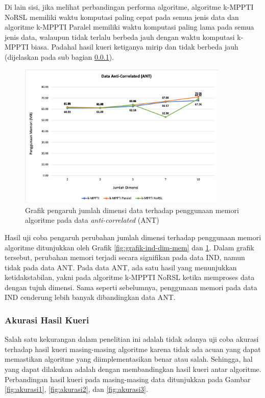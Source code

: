 Di lain sisi, jika melihat perbandingan performa algoritme, algoritme k-MPPTI NoRSL memiliki waktu komputasi paling cepat pada semua jenis data dan algoritme k-MPPTI Paralel memiliki waktu komputasi paling lama pada semua jenis data, walaupun tidak terlalu berbeda jauh dengan waktu komputasi k-MPPTI biasa. Padahal hasil kueri ketiganya mirip dan tidak berbeda jauh (dijelaskan pada sub bagian \ref{hasil-kueri}).

\begin{figure}[H]
	\centering
	\includegraphics[width=10cm]{assets/img/bab5/grafik-ant-dim-mem.png}
	\caption{Grafik pengaruh jumlah dimensi data terhadap penggunaan memori algoritme pada data \textit{anti-correlated} (ANT)}
	\label{fig:grafik-ant-dim-mem}
\end{figure}

Hasil uji coba pengaruh perubahan jumlah dimensi terhadap penggunaan memori algoritme ditunjukkan oleh Grafik \ref{fig:grafik-ind-dim-mem} dan \ref{fig:grafik-ant-dim-mem}. Dalam grafik tersebut, perubahan memori terjadi secara signifikan pada data IND, namun tidak pada data ANT. Pada data ANT, ada satu hasil yang menunjukkan ketidakstabilan, yakni pada algoritme k-MPPTI NoRSL ketika memproses data dengan tujuh dimensi. Sama seperti sebelumnya, penggunaan memori pada data IND cenderung lebih banyak dibandingkan data ANT.

\pagebreak
\subsubsection{Akurasi Hasil Kueri} \label{hasil-kueri}
\tab Salah satu kekurangan dalam penelitian ini adalah tidak adanya uji coba akurasi terhadap hasil kueri masing-masing algoritme karena tidak ada acuan yang dapat memastikan algoritme yang diimplementasikan benar atau salah. Sehingga, hal yang dapat dilakukan adalah dengan membandingkan hasil kueri antar algoritme. Perbandingan hasil kueri pada masing-masing data ditunjukkan pada Gambar \ref{fig:akurasi1}, \ref{fig:akurasi2}, dan \ref{fig:akurasi3}.

